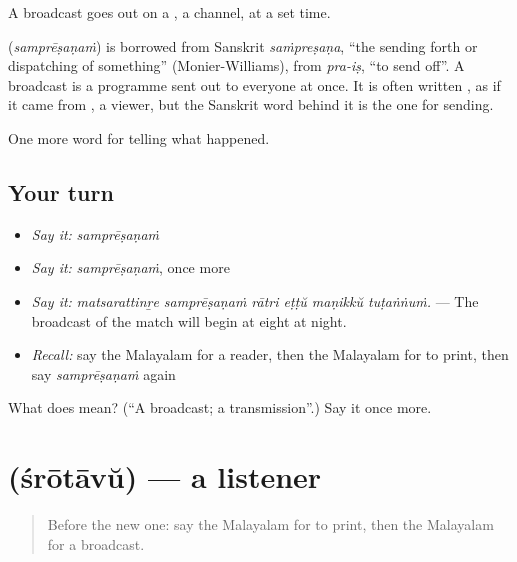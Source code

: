 A broadcast goes out on a , a channel, at a set time.

\begin{cousinweb}
\textbf{} (\emph{samprēṣaṇaṁ}) is borrowed from Sanskrit \emph{saṁpreṣaṇa}, \textquotedblleft{}the sending forth or dispatching of something\textquotedblright{} (Monier-Williams), from \emph{pra-iṣ}, \textquotedblleft{}to send off\textquotedblright{}. A broadcast is a programme sent out to everyone at once. It is often written , as if it came from , a viewer, but the Sanskrit word behind it is the one for sending.
\end{cousinweb}

\begin{grammarlens}[title={What you've built}]
One more word for telling what happened.
\end{grammarlens}

\subsection*{Your turn}
\begin{itemize}
\raggedright
  \item \emph{Say it:} \emph{samprēṣaṇaṁ}
  \item \emph{Say it:} \emph{samprēṣaṇaṁ}, once more
  \item \emph{Say it:} \emph{matsarattinṟe samprēṣaṇaṁ rātri eṭṭŭ maṇikkŭ tuṭaṅṅuṁ.} — The broadcast of the match will begin at eight at night.
  \item \emph{Recall:} say the Malayalam for a reader, then the Malayalam for to print, then say \emph{samprēṣaṇaṁ} again
\end{itemize}

\begin{tcolorbox}[breakable,colback=teal!4,colframe=teal!35!black,title={Before you move on}]
What does  mean? (\textquotedblleft{}A broadcast; a transmission\textquotedblright{}.) Say it once more.
\end{tcolorbox}
\section[\texorpdfstring{\ml{ശ്രോതാവ്} (śrōtāvŭ)}{ശ്രോതാവ് (śrōtāvŭ)}]{ (śrōtāvŭ) — a listener}

\label{lesson:ML-C351-srotavu}



\begin{quote}
Before the new one: say the Malayalam for to print, then the Malayalam for a broadcast.
\end{quote}

